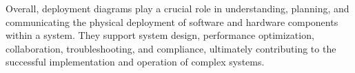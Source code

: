 \documentclass{article}
\begin{document}
Overall, deployment diagrams play a crucial role in understanding, planning, and communicating the physical deployment of software and hardware components within a system. They support system design, performance optimization, collaboration, troubleshooting, and compliance, ultimately contributing to the successful implementation and operation of complex systems.
\end{document}
